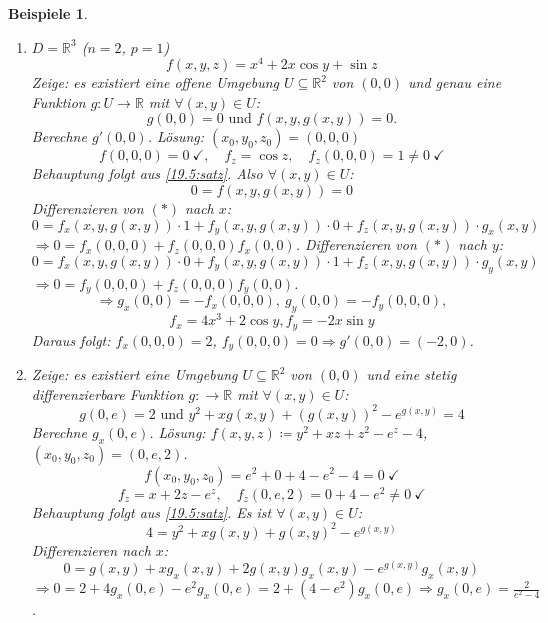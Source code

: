 \documentclass[12pt]{extreport} %
\newcommand{\R}{\mathbb{R}}
\theoremstyle{named}
\theoremstyle{nnamed}
\theoremstyle{itshape}
\theoremstyle{normal}
\newtheorem*{beispiele}{Beispiele}
\begin{document}
\begin{beispiele} ~\
	\begin{enumerate}
		\item $D = \R^{3}$ ($n =2$, $p = 1$)
			$$ f(x, y, z) = x^{4} + 2x \cos y + \sin z $$
			Zeige: es existiert eine offene Umgebung $U \subseteq \R^{2}$ von $(0, 0)$ und genau eine Funktion $g \colon U \rightarrow \R$ mit $\forall (x, y) \in U$:
			$$ g(0, 0) = 0 \text{ und } f(x, y, g(x, y)) = 0. $$
			Berechne $g'(0, 0)$. Lösung: $(x_{0}, y_{0}, z_{0}) = (0, 0, 0)$
			$$ f(0,0,0) = 0 ~\checkmark , \quad f_{z} = \cos z, \quad f_{z} (0,0,0) = 1 \neq 0 ~\checkmark $$
			Behauptung folgt aus \ref{19.5:satz}. Also $\forall (x, y) \in U$:
			\begin{equation*}
				0 = f(x, y, g(x, y)) = 0 \tag*{$(*)$}
			\end{equation*}
			Differenzieren von $(*)$ nach $x$:
			$$ 0 = f_{x}(x, y, g(x, y)) \cdot 1 + f_{y}(x, y, g(x,y)) \cdot 0 + f_{z}(x,y, g(x,y)) \cdot g_{x}(x, y) $$
			$\Rightarrow 0 = f_{x}(0,0,0) + f_{z}(0,0,0) f_{x}(0,0)$. Differenzieren von $(*)$ nach $y$:
			$$ 0 = f_{x}(x, y, g(x, y)) \cdot 0 + f_{y}(x, y, g(x,y)) \cdot 1 + f_{z}(x,y, g(x,y)) \cdot g_{y}(x, y) $$
			$\Rightarrow 0 = f_{y}(0,0,0) + f_{z}(0,0,0) f_{y}(0,0)$.
			$$ \Longrightarrow g_{x}(0,0) = -f_{x}(0,0,0), ~ g_{y}(0,0) = - f_{y}(0,0,0), $$ 
			$$ f_{x} = 4x^{3} + 2 \cos y, f_{y} = -2x \sin y $$
			Daraus folgt: $f_{x}(0,0,0) = 2$, $f_{y}(0,0,0) = 0 \Rightarrow g'(0,0) = (-2, 0)$.
		\item Zeige: es existiert eine Umgebung $U \subseteq \R^{2}$ von $(0,0)$ und eine stetig differenzierbare Funktion $g \colon \rightarrow \R$ mit $\forall (x, y) \in U$:
			$$ g(0, e) = 2 \text{ und } y^{2} + x g(x, y) + \left( g(x, y) \right)^{2} - e^{g(x, y)} = 4 $$
			Berechne $g_{x}(0, e)$. Lösung: $f(x, y, z) \coloneqq y^{2} + xz + z^{2} - e^{z} - 4$, $(x_{0}, y_{0}, z_{0}) = (0, e, 2)$.
			$$ f(x_{0}, y_{0}, z_{0}) = e^{2} + 0 + 4 - e^{2} - 4 = 0 ~\checkmark $$
			$$ f_{z} = x + 2z - e^{z}, \quad f_{z}(0, e, 2) = 0 + 4 - e^{2} \neq 0 ~\checkmark $$
			Behauptung folgt aus \ref{19.5:satz}. Es ist $\forall (x, y) \in U$:
			$$ 4 = y^{2} + x g(x, y) + g(x, y)^{2} - e^{g(x, y)} $$
			Differenzieren nach $x$:
			$$ 0 = g(x, y) + x g_{x}(x,y) + 2 g(x,y) g_{x}(x, y) - e^{g(x, y)} g_{x}(x, y) $$
			$\Rightarrow 0 = 2 + 4 g_{x}(0, e) - e^{2} g_{x}(0, e) = 2 + \left( 4 - e^{2} \right) g_{x}(0, e) \Rightarrow g_{x}(0, e) = \frac{2}{e^{2} - 4}$.
	\end{enumerate}
\end{beispiele}
\end{document}
